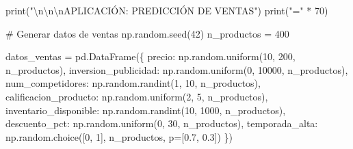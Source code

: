 \documentclass[
  doc,
  floatsintext,
  longtable,
  a4paper,
  nolmodern,
  notxfonts,
  notimes,
  12pt,
  colorlinks=true,linkcolor=blue,citecolor=blue,urlcolor=blue]{apa7}
\newenvironment{Shaded}{\begin{snugshade}}{\end{snugshade}}
\newcommand{\BuiltInTok}[1]{\textcolor[rgb]{0.00,0.23,0.31}{#1}}
\newcommand{\CharTok}[1]{\textcolor[rgb]{0.13,0.47,0.30}{#1}}
\newcommand{\CommentTok}[1]{\textcolor[rgb]{0.37,0.37,0.37}{#1}}
\newcommand{\DecValTok}[1]{\textcolor[rgb]{0.68,0.00,0.00}{#1}}
\newcommand{\FloatTok}[1]{\textcolor[rgb]{0.68,0.00,0.00}{#1}}
\newcommand{\NormalTok}[1]{\textcolor[rgb]{0.00,0.23,0.31}{#1}}
\newcommand{\OperatorTok}[1]{\textcolor[rgb]{0.37,0.37,0.37}{#1}}
\newcommand{\StringTok}[1]{\textcolor[rgb]{0.13,0.47,0.30}{#1}}
\begin{document}
\begin{Shaded}
\begin{Highlighting}[]
\BuiltInTok{print}\NormalTok{(}\StringTok{"}\CharTok{\textbackslash{}n\textbackslash{}n\textbackslash{}n}\StringTok{APLICACIÓN: PREDICCIÓN DE VENTAS"}\NormalTok{)}
\BuiltInTok{print}\NormalTok{(}\StringTok{"="} \OperatorTok{*} \DecValTok{70}\NormalTok{)}

\CommentTok{\# Generar datos de ventas}
\NormalTok{np.random.seed(}\DecValTok{42}\NormalTok{)}
\NormalTok{n\_productos }\OperatorTok{=} \DecValTok{400}

\NormalTok{datos\_ventas }\OperatorTok{=}\NormalTok{ pd.DataFrame(\{}
    \StringTok{\textquotesingle{}precio\textquotesingle{}}\NormalTok{: np.random.uniform(}\DecValTok{10}\NormalTok{, }\DecValTok{200}\NormalTok{, n\_productos),}
    \StringTok{\textquotesingle{}inversion\_publicidad\textquotesingle{}}\NormalTok{: np.random.uniform(}\DecValTok{0}\NormalTok{, }\DecValTok{10000}\NormalTok{, n\_productos),}
    \StringTok{\textquotesingle{}num\_competidores\textquotesingle{}}\NormalTok{: np.random.randint(}\DecValTok{1}\NormalTok{, }\DecValTok{10}\NormalTok{, n\_productos),}
    \StringTok{\textquotesingle{}calificacion\_producto\textquotesingle{}}\NormalTok{: np.random.uniform(}\DecValTok{2}\NormalTok{, }\DecValTok{5}\NormalTok{, n\_productos),}
    \StringTok{\textquotesingle{}inventario\_disponible\textquotesingle{}}\NormalTok{: np.random.randint(}\DecValTok{10}\NormalTok{, }\DecValTok{1000}\NormalTok{, n\_productos),}
    \StringTok{\textquotesingle{}descuento\_pct\textquotesingle{}}\NormalTok{: np.random.uniform(}\DecValTok{0}\NormalTok{, }\DecValTok{30}\NormalTok{, n\_productos),}
    \StringTok{\textquotesingle{}temporada\_alta\textquotesingle{}}\NormalTok{: np.random.choice([}\DecValTok{0}\NormalTok{, }\DecValTok{1}\NormalTok{], n\_productos, p}\OperatorTok{=}\NormalTok{[}\FloatTok{0.7}\NormalTok{, }\FloatTok{0.3}\NormalTok{])}
\NormalTok{\})}


\end{Highlighting}
\end{Shaded}
\end{document}
